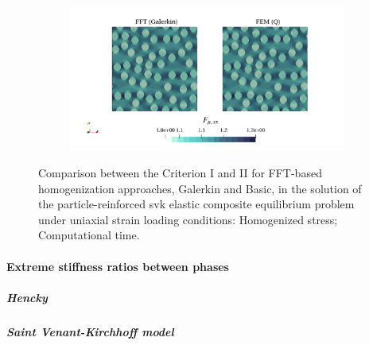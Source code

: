 \begin{figure}[hbt]
\begin{subfigure}[b]{0.49\textwidth}
    \caption{}
    \label{subfig:svk_2D_normal_cpu_time_vs_n_voxels}
  \end{subfigure}
  \begin{subfigure}[b]{\textwidth}
    \centering
    \includegraphics[width=\textwidth]{figures/svk_2D_normal_strain_11}
    \caption{}
    \label{subfig:svk_2D_normal_strain_11}
  \end{subfigure}
  \caption{Comparison between the Criterion I and II for FFT-based homogenization
  approaches, Galerkin and Basic, in the solution of the particle-reinforced svk elastic
  composite equilibrium problem under uniaxial strain loading conditions:
   Homogenized
  stress;  Computational
  time.}
\label{fig:svk_2D_normal}
\end{figure}

\FloatBarrier

\paragraph{Extreme stiffness ratios between phases}

\subparagraph{Hencky}

\subparagraph{Saint Venant-Kirchhoff model}

